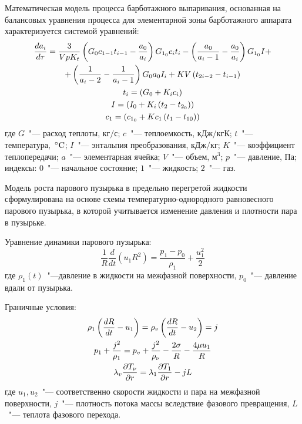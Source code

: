 Математическая модель процесса барботажного выпаривания, основанная на балансовых уравнения процесса \cite{Reypnazarova.Mathematical.2008} для элементарной зоны барботажного аппарата характеризуется системой уравнений:
\begin{gather}
\frac{d{a}_{i}}{d\tau }=\frac{3}{Vp{K}_{t}}\left({G}_{0}{c}_{1-1}{t}_{i-1}-\frac{{a}_{0}}{{a}_{i}}\right){G}_{1_0}{c}_{i}{t}_{i}- \left(\frac{{a}_{0}}{{a}_{i}-1}-\frac{{a}_{0}}{{a}_{i}}\right){G}_{1_0}I+\notag\\
+\left(\frac{1}{{a}_{i}-2}-\frac{1}{{a}_{i}-1}\right){G}_{0}{a}_{0}{I}_{i}+ KV\left({t}_{2i-2}-{t}_{i-1}\right)\notag\\
 {t}_{i}=\left({G}_{0}+{K}_{i}{c}_{i}\right) \\
 I=\left({I}_{0}+{K}_{i}\left({t}_{2}-{t}_{2_0}\right)\right) \notag\\
 {c}_{1}=\left({c}_{1_0}+K{c}_{1}\left({t}_{1}-{t}_{10}\right)\right) \notag
\end{gather}
где \(G\)~"--- расход теплоты, \(\text{кг}/\text{с}\); \(c\)~"--- теплоемкость, \(\text{кДж}/\text{кгК} \); \(t\)~"--- температура, \(\,^{\circ}\mathrm{C}\);
\(I\)~"--- энтальпия преобразования, \(\text{кДж}/\text{кг}\); \(K\)~"--- коэффициент теплопередачи; \(a\)~"--- элементарная ячейка; \(V\)~"--- объем,
\(\text{м}^{3}\); \(p\)~"--- давление, Па; индексы: \(0\)~"--- начальное состояние; \(1\)~"--- жидкость; \(2\)~"--- газ.

Модель роста парового пузырька в предельно перегретой жидкости~\cite{Aktershev.Rost.2005} сформулирована на основе схемы температурно-однородного равновесного парового пузырька, в которой учитывается изменение давления и плотности пара в пузырьке.

Уравнение динамики парового пузырька:
\begin{equation}
\frac{1}{R}\frac{d}{dt}\left({u}_{1}{R}^{2}\right)=\frac{{p}_{1}-{p}_{0}}{{\rho }_{1}}+\frac{{u}_{1}^{2}}{2} 
\end{equation}
где \(\rho_{1}(t)\)~"---давление в жидкости на межфазной поверхности, \(p_{0}\)~"--- давление
вдали от пузырька.

Граничные условия:
\begin{gather}
{\rho }_{1}\left(\frac{dR}{dt}-{u}_{1}\right)={\rho }_{v}\left(\frac{dR}{dt}-{u}_{2}\right)=j \notag \\
{p}_{1}+\frac{{j}^{2}}{{\rho }_{1}}={p}_{v}+\frac{{j}^{2}}{{\rho }_{\nu }}-\frac{2\sigma }{R}-\frac{4\mu {u}_{1}}{R}\\
 {\lambda }_{v}\frac{\partial {T}_{\nu }}{\partial r}={\lambda }_{1}\frac{\partial {T}_{1}}{\partial r}-jL \notag
\end{gather}
где \({u}_{1}, {u}_{2}\)~"--- соответственно скорости жидкости и пара на межфазной поверхности, \(j\)~"--- плотность потока массы вследствие фазового превращения, \(L\)~"--- теплота фазового перехода.

